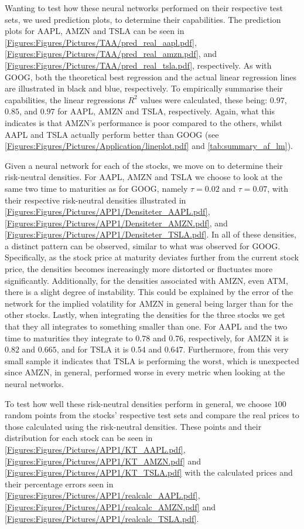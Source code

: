 Wanting to test how these neural networks performed on their respective test sets, we used prediction plots, to determine their capabilities. The prediction plots for AAPL, AMZN and TSLA can be seen in \autoref{Figures:Figures/Pictures/TAA/pred_real_aapl.pdf}, \autoref{Figures:Figures/Pictures/TAA/pred_real_amzn.pdf}, and \autoref{Figures:Figures/Pictures/TAA/pred_real_tsla.pdf}, respectively. As with GOOG, both the theoretical best regression and the actual linear regression lines are illustrated in black and blue, respectively. To empirically summarise their capabilities, the linear regressions $R^2$ values were calculated, these being: $0.97$, $0.85$, and $0.97$ for AAPL, AMZN and TSLA, respectively. Again, what this indicates is that AMZN's performance is poor compared to the others, whilst AAPL and TSLA actually perform better than GOOG (see \autoref{Figures:Figures/Pictures/Application/lineplot.pdf} and \autoref{tab:summary_af_lm}).

Given a neural network for each of the stocks, we move on to determine their risk-neutral densities. For AAPL, AMZN and TSLA we choose to look at the same two time to maturities as for GOOG, namely $\tau=0.02$ and $\tau = 0.07$, with their respective risk-neutral densities illustrated in \autoref{Figures:Figures/Pictures/APP1/Densiteter_AAPL.pdf}, \autoref{Figures:Figures/Pictures/APP1/Densiteter_AMZN.pdf}, and \autoref{Figures:Figures/Pictures/APP1/Densiteter_TSLA.pdf}. In all of these densities, a distinct pattern can be observed, similar to what was observed for GOOG. Specifically, as the stock price at maturity deviates further from the current stock price, the densities becomes increasingly more distorted or fluctuates more significantly. Additionally, for the densities associated with AMZN, even ATM, there is a slight degree of instability. This could be explained by the error of the network for the implied volatility for AMZN in general being larger than for the other stocks. Lastly, when integrating the densities for the three stocks we get that they all integrates to something smaller than one. For AAPL and the two time to maturities they integrate to $0.78$ and $0.76$, respectively, for AMZN it is $0.82$ and $0.665$, and for TSLA it is $0.54$ and $0.647$. Furthermore, from this very small sample it indicates that TSLA is performing the worst, which is unexpected since AMZN, in general, performed worse in every metric when looking at the neural networks.

To test how well these risk-neutral densities perform in general, we choose $100$ random points from the stocks' respective test sets and compare the real prices to those calculated using the risk-neutral densities. These points and their distribution for each stock can be seen in \autoref{Figures:Figures/Pictures/APP1/KT_AAPL.pdf}, \autoref{Figures:Figures/Pictures/APP1/KT_AMZN.pdf} and \autoref{Figures:Figures/Pictures/APP1/KT_TSLA.pdf} with the calculated prices and their percentage errors seen in \autoref{Figures:Figures/Pictures/APP1/realcalc_AAPL.pdf}, \autoref{Figures:Figures/Pictures/APP1/realcalc_AMZN.pdf} and \autoref{Figures:Figures/Pictures/APP1/realcalc_TSLA.pdf}. 

